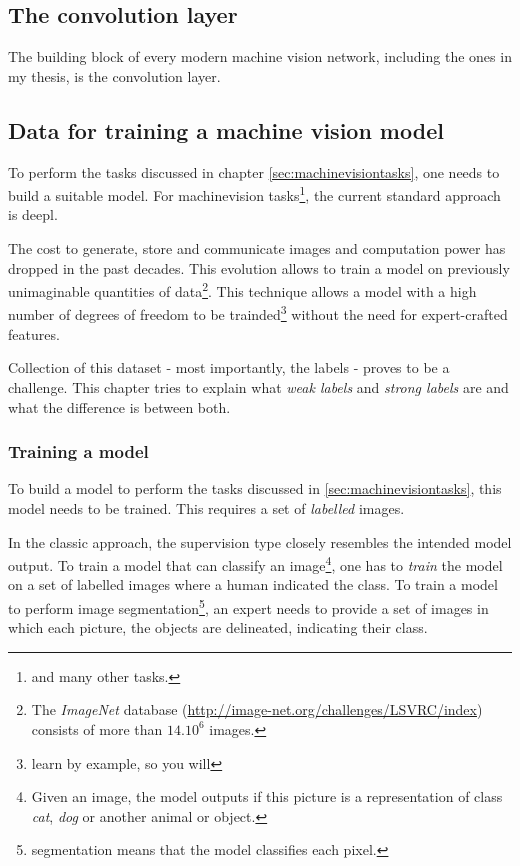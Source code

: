 \subsection{The convolution layer}

The building block of every modern machine vision network, including the ones in my thesis, is the convolution layer.


\subsection{Data for training a machine vision model}

To perform the tasks discussed in chapter \ref{sec:machinevisiontasks}, one needs to build a suitable model.
For \Gls{machinevision} tasks\footnote{and many other tasks.}, the current standard approach is \Gls{deepl}.


The cost to generate, store and communicate images and computation power has dropped in the past decades.
This evolution allows to train a model  on previously unimaginable quantities of data\footnote{The \textit{ImageNet} database (\url{http://image-net.org/challenges/LSVRC/index}) consists of more than $14.10^6$ images.}.
This technique allows a model with a high number of degrees of freedom to be trainded\footnote{learn by example, so you will} without the need for expert-crafted features. 


Collection of this dataset - most importantly, the labels - proves to be a challenge. 
This chapter tries to explain what \textit{weak labels} and \textit{strong labels} are and what the difference is between both.

\subsubsection{Training a model}

To build a model to perform the tasks discussed in \ref{sec:machinevisiontasks}, this model needs to be trained.
This requires a set of \textit{labelled} images. 

In the classic approach, the supervision type closely resembles the intended model output.
To train a model that can classify an image\footnote{Given an image, the model outputs if this picture is a representation of class \textit{cat}, \textit{dog} or another animal or object. }, 
one has to \textit{train} the model on a set of labelled images where a human indicated the class.
To train a model to perform image segmentation\footnote{segmentation means that the model classifies each pixel.}, an expert needs to provide a set of images in which
each picture, the objects are delineated, indicating their class.  



